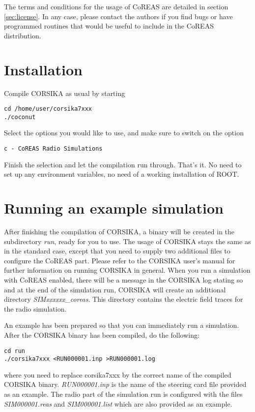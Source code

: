 \documentclass[a4paper,10pt]{article}
\begin{document}
The terms and conditions for the usage of CoREAS are detailed in section \ref{sec:license}. In any case, please contact the authors if you find bugs or have programmed routines that would be useful to include in the CoREAS distribution.

\section{Installation}

Compile CORSIKA as usual by starting
%
\begin{verbatim}
cd /home/user/corsika7xxx
./coconut
\end{verbatim}
%
Select the options you would like to use, and make sure to switch on the option
%
\begin{verbatim}
c - CoREAS Radio Simulations
\end{verbatim}
%
Finish the selection and let the compilation run through. That's it. No need to set up any environment variables, no need of a working installation of ROOT.

\section{Running an example simulation}

After finishing the compilation of CORSIKA, a binary will be created in the subdirectory {\it run}, ready for you to use. The usage of CORSIKA stays the same as in the standard case, except that you need to supply two additional files to configure the CoREAS part. Please refer to the CORSIKA user's manual for further information on running CORSIKA in general. When you run a simulation with CoREAS enabled, there will be a message in the CORSIKA log stating so and at the end of the simulation run, CORSIKA will create an additional directory {\it SIMxxxxxx\_coreas}. This directory contains the electric field traces for the radio simulation.

An example has been prepared so that you can immediately run a simulation. After the CORSIKA binary has been compiled, do the following:
%
\begin{verbatim}
cd run
./corsika7xxx <RUN000001.inp >RUN000001.log
\end{verbatim}
%
where you need to replace corsika7xxx by the correct name of the compiled CORSIKA binary. {\it RUN000001.inp} is the name of the steering card file provided as an example. The radio part of the simulation run is configured with the files {\it SIM000001.reas} and {\it SIM000001.list} which are also provided as an example.
\end{document}
